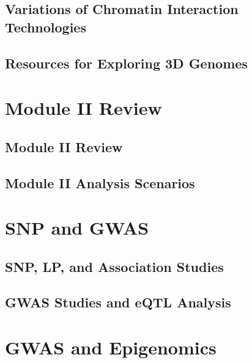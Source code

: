 \documentclass[
]{book}
\begin{document}
\hypertarget{variations-of-chromatin-interaction-technologies}{%
\section{Variations of Chromatin Interaction Technologies}\label{variations-of-chromatin-interaction-technologies}}

\hypertarget{resources-for-exploring-3d-genomes}{%
\section{Resources for Exploring 3D Genomes}\label{resources-for-exploring-3d-genomes}}

\hypertarget{m2re}{%
\chapter{Module II Review}\label{m2re}}

\hypertarget{module-ii-review}{%
\section{Module II Review}\label{module-ii-review}}

\hypertarget{module-ii-analysis-scenarios}{%
\section{Module II Analysis Scenarios}\label{module-ii-analysis-scenarios}}

\hypertarget{gwas1}{%
\chapter{SNP and GWAS}\label{gwas1}}

\hypertarget{snp-lp-and-association-studies}{%
\section{SNP, LP, and Association Studies}\label{snp-lp-and-association-studies}}

\hypertarget{gwas-studies-and-eqtl-analysis}{%
\section{GWAS Studies and eQTL Analysis}\label{gwas-studies-and-eqtl-analysis}}

\hypertarget{gwas2}{%
\chapter{GWAS and Epigenomics}\label{gwas2}}
\end{document}
